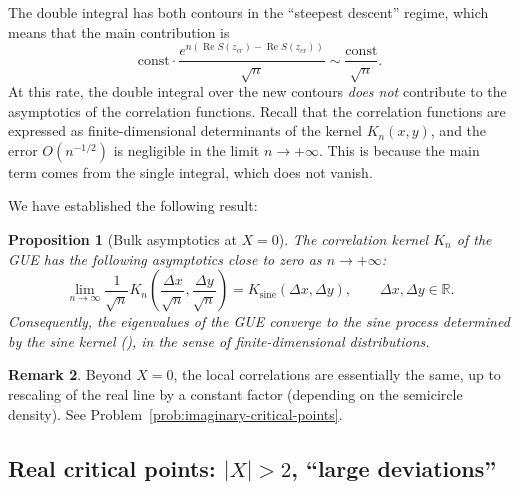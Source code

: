 \documentclass[letterpaper,11pt,oneside,reqno]{article}
\numberwithin{equation}{section}
\newtheorem{proposition}{Proposition}[section]
\theoremstyle{definition}
\newtheorem{remark}[proposition]{Remark}
\begin{document}
The double integral has both contours
in the ``steepest descent'' regime, which means that
the main contribution is
\begin{equation*}
	\mathrm{const}\cdot
	\frac{e^{n\left( \operatorname{Re}S(z_{cr})-\operatorname{Re}S(z_{cr}) \right)}}{\sqrt n}
	\sim \frac{\mathrm{const}}{\sqrt n}.
\end{equation*}
At this rate, the double integral over the new contours
\emph{does not} contribute to the asymptotics of the correlation functions.
Recall that the correlation functions are expressed as finite-dimensional
determinants of the kernel $K_n(x,y)$, and the error $O(n^{-1/2})$ is
negligible in the limit $n\to+\infty$.
This is because the main term comes from the single integral,
which does not vanish.

We have established the following result:
\begin{proposition}[Bulk asymptotics at $X=0$]
	\label{prop:bulk}
	The correlation kernel $K_n$ of the GUE has the following asymptotics
	close to zero as $n\to+\infty$:
	\begin{equation*}
		\lim_{n\to \infty}
		\frac{1}{\sqrt n}
		K_n\left( \frac{\Delta x}{\sqrt n},\frac{\Delta y}{\sqrt n} \right)
		=
		K_{\mathrm{sine}}\left( \Delta x,\Delta y \right),
		\qquad \Delta x,\Delta y\in\mathbb{R}.
	\end{equation*}
	Consequently, the eigenvalues of the GUE converge to the sine process
	determined by the sine kernel (),
	in the sense of finite-dimensional distributions.
\end{proposition}

\begin{remark}
	Beyond $X=0$, the local correlations are essentially the same,
	up to rescaling of the real line by a constant factor (depending
	on the semicircle density).
	See Problem~\ref{prob:imaginary-critical-points}.
\end{remark}

\subsection{Real critical points: $|X|>2$, ``large deviations''}
\label{sub:real-critical-points}
\end{document}
